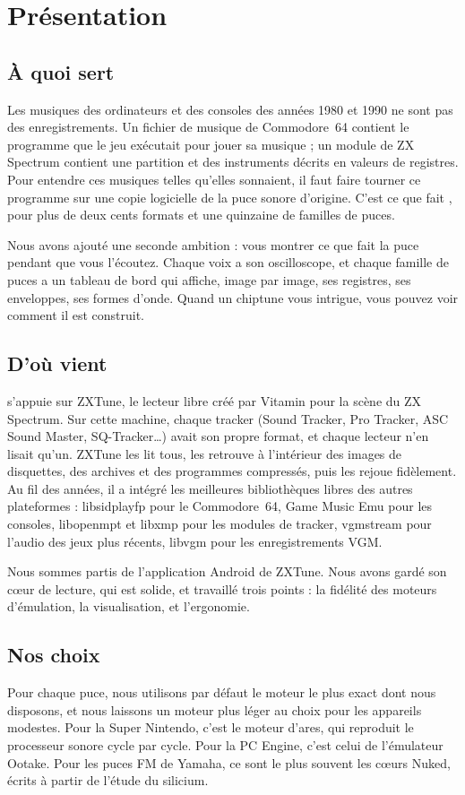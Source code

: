 \chapter{Présentation}

\section{À quoi sert \soft}
Les musiques des ordinateurs et des consoles des années 1980 et 1990 ne sont pas des enregistrements. Un fichier
de musique de Commodore~64 contient le programme que le jeu exécutait pour jouer sa musique ; un module de ZX
Spectrum contient une partition et des instruments décrits en valeurs de registres. Pour entendre ces musiques
telles qu'elles sonnaient, il faut faire tourner ce programme sur une copie logicielle de la puce sonore d'origine.
C'est ce que fait \soft, pour plus de deux cents formats et une quinzaine de familles de puces.

Nous avons ajouté une seconde ambition : vous montrer ce que fait la puce pendant que vous l'écoutez. Chaque voix a
son oscilloscope, et chaque famille de puces a un tableau de bord qui affiche, image par image, ses registres, ses
enveloppes, ses formes d'onde. Quand un chiptune vous intrigue, vous pouvez voir comment il est construit.

\section{D'où vient \soft}
\soft s'appuie sur ZXTune, le lecteur libre créé par Vitamin pour la scène du ZX Spectrum. Sur cette machine, chaque
tracker (Sound Tracker, Pro Tracker, ASC Sound Master, SQ-Tracker\dots) avait son propre format, et chaque lecteur
n'en lisait qu'un. ZXTune les lit tous, les retrouve à l'intérieur des images de disquettes, des archives et des
programmes compressés, puis les rejoue fidèlement. Au fil des années, il a intégré les meilleures bibliothèques
libres des autres plateformes : libsidplayfp pour le Commodore~64, Game Music Emu pour les consoles, libopenmpt et
libxmp pour les modules de tracker, vgmstream pour l'audio des jeux plus récents, libvgm pour les enregistrements
VGM.

Nous sommes partis de l'application Android de ZXTune. Nous avons gardé son cœur de lecture, qui est solide, et
travaillé trois points : la fidélité des moteurs d'émulation, la visualisation, et l'ergonomie.

\section{Nos choix}
Pour chaque puce, nous utilisons par défaut le moteur le plus exact dont nous disposons, et nous laissons un moteur
plus léger au choix pour les appareils modestes. Pour la Super Nintendo, c'est le moteur d'ares, qui reproduit le
processeur sonore cycle par cycle. Pour la PC Engine, c'est celui de l'émulateur Ootake. Pour les puces FM de
Yamaha, ce sont le plus souvent les cœurs Nuked, écrits à partir de l'étude du silicium.

